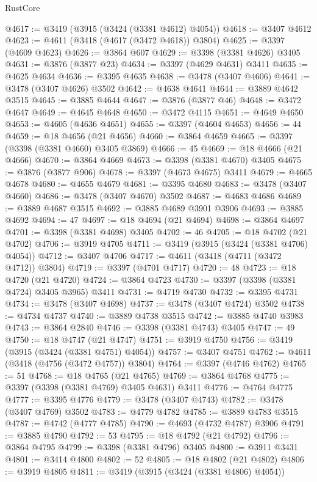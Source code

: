 \begin{lexlean}{RustCore}
\begin{coremodule}
@4617 := @3419 (@3915 (@3424 (@3381 @4612) @4054))
@4618 := @3407 @4612
@4623 := @4611 (@3418 (@4617 (@3472 @4618)) @3804)
@4625 := @3397 (@4609 @4623)
@4626 := @3864 @607
@4629 := @3398 (@3381 @4626) @3405
@4631 := @3876 (@3877 @23)
@4634 := @3397 (@4629 @4631) @3411
@4635 := @4625 @4634
@4636 := @3395 @4635
@4638 := @3478 (@3407 @4606)
@4641 := @3478 (@3407 @4626) @3502
@4642 := @4638 @4641
@4644 := @3889 @4642 @3515
@4645 := @3885 @4644
@4647 := @3876 (@3877 @46)
@4648 := @3472 @4647
@4649 := @4645 @4648
@4650 := @3472 @4115
@4651 := @4649 @4650
@4653 := @4605 (@4636 @4651)
@4655 := @3397 (@4604 @4653)
@4656 := 44
@4659 := @18 @4656 (@21 @4656)
@4660 := @3864 @4659
@4665 := @3397 (@3398 (@3381 @4660) @3405 @3869)
@4666 := 45
@4669 := @18 @4666 (@21 @4666)
@4670 := @3864 @4669
@4673 := @3398 (@3381 @4670) @3405
@4675 := @3876 (@3877 @906)
@4678 := @3397 (@4673 @4675) @3411
@4679 := @4665 @4678
@4680 := @4655 @4679
@4681 := @3395 @4680
@4683 := @3478 (@3407 @4660)
@4686 := @3478 (@3407 @4670) @3502
@4687 := @4683 @4686
@4689 := @3889 @4687 @3515
@4692 := @3885 @4689 @3901 @3906
@4693 := @3885 @4692
@4694 := 47
@4697 := @18 @4694 (@21 @4694)
@4698 := @3864 @4697
@4701 := @3398 (@3381 @4698) @3405
@4702 := 46
@4705 := @18 @4702 (@21 @4702)
@4706 := @3919 @4705
@4711 := @3419 (@3915 (@3424 (@3381 @4706) @4054))
@4712 := @3407 @4706
@4717 := @4611 (@3418 (@4711 (@3472 @4712)) @3804)
@4719 := @3397 (@4701 @4717)
@4720 := 48
@4723 := @18 @4720 (@21 @4720)
@4724 := @3864 @4723
@4730 := @3397 (@3398 (@3381 @4724) @3405 @3965) @3411
@4731 := @4719 @4730
@4732 := @3395 @4731
@4734 := @3478 (@3407 @4698)
@4737 := @3478 (@3407 @4724) @3502
@4738 := @4734 @4737
@4740 := @3889 @4738 @3515
@4742 := @3885 @4740 @3983
@4743 := @3864 @2840
@4746 := @3398 (@3381 @4743) @3405
@4747 := 49
@4750 := @18 @4747 (@21 @4747)
@4751 := @3919 @4750
@4756 := @3419 (@3915 (@3424 (@3381 @4751) @4054))
@4757 := @3407 @4751
@4762 := @4611 (@3418 (@4756 (@3472 @4757)) @3804)
@4764 := @3397 (@4746 @4762)
@4765 := 51
@4768 := @18 @4765 (@21 @4765)
@4769 := @3864 @4768
@4775 := @3397 (@3398 (@3381 @4769) @3405 @4631) @3411
@4776 := @4764 @4775
@4777 := @3395 @4776
@4779 := @3478 (@3407 @4743)
@4782 := @3478 (@3407 @4769) @3502
@4783 := @4779 @4782
@4785 := @3889 @4783 @3515
@4787 := @4742 (@4777 @4785)
@4790 := @4693 (@4732 @4787) @3906
@4791 := @3885 @4790
@4792 := 53
@4795 := @18 @4792 (@21 @4792)
@4796 := @3864 @4795
@4799 := @3398 (@3381 @4796) @3405
@4800 := @3911 @3431
@4801 := @3414 @4800
@4802 := 52
@4805 := @18 @4802 (@21 @4802)
@4806 := @3919 @4805
@4811 := @3419 (@3915 (@3424 (@3381 @4806) @4054))

\end{coremodule}
\end{lexlean}

